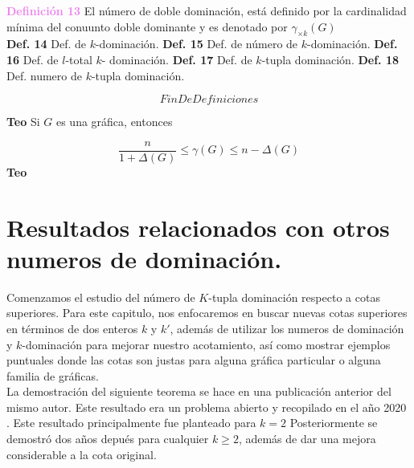 \documentclass{article}
\begin{document}
\textcolor{Violet}{\textbf{Definición 13}} El número de doble dominación, está definido por la cardinalidad mínima del conuunto doble dominante y es denotado por $\gamma_{\times k}(G)$\\

\textbf{Def. 14} Def. de $k$-dominación.\newline
\textbf{Def. 15} Def. de número de $k$-dominación.\newline
\textbf{Def. 16} Def. de $l$-total $k$- dominación.\newline
\textbf{Def. 17} Def. de $k$-tupla dominación.\newline
\textbf{Def. 18} Def. numero de $k$-tupla dominación.\newline

	$$FinDeDefiniciones$$

\textbf{Teo} 
Si $G$ es una gráfica, entonces

$$\frac{n}{1+\Delta(G)}\leq \gamma(G)\leq n-\Delta(G)$$
\textbf{Teo} 


\newpage

\section{Resultados relacionados con otros numeros de dominación.}

Comenzamos el estudio del número de $K$-tupla dominación respecto a cotas superiores. Para este capitulo, nos enfocaremos en buscar nuevas cotas superiores en términos de dos enteros $k$ y $k'$, además de utilizar los numeros de dominación y $k$-dominación para mejorar nuestro acotamiento, así como mostrar ejemplos puntuales donde las cotas son justas para alguna gráfica particular o alguna familia de gráficas.\\

La demostración del siguiente teorema se hace en una publicación anterior del mismo autor. Este resultado era un problema abierto y recopilado en el año 2020 \cite{hansberg2020multiple}. Este resultado principalmente fue planteado para $k=2$ Posteriormente se demostró dos años depués para cualquier $k\geq 2$, además de dar una mejora considerable a la cota original.\\
\end{document}
